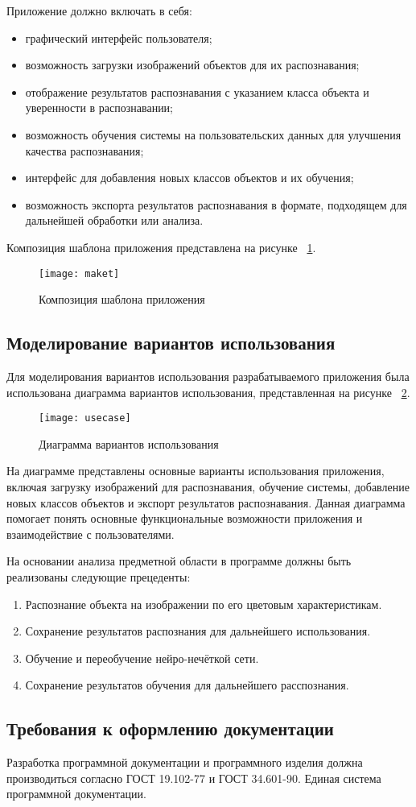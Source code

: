 Приложение должно включать в себя:
\begin{itemize}
    \item графический интерфейс пользователя;
    \item возможность загрузки изображений объектов для их распознавания;
    \item отображение результатов распознавания с указанием класса объекта и уверенности в распознавании;
    \item возможность обучения системы на пользовательских данных для улучшения качества распознавания;
    \item интерфейс для добавления новых классов объектов и их обучения;
    \item возможность экспорта результатов распознавания в формате, подходящем для дальнейшей обработки или анализа.
\end{itemize}

Композиция шаблона приложения представлена на рисунке ~\ref{maket:image}.

\begin{figure}[ht]
\texttt{[image: maket]}
\caption{Композиция шаблона приложения}
\label{maket:image}
\end{figure}

\subsection{Моделирование вариантов использования}

Для моделирования вариантов использования разрабатываемого приложения была использована диаграмма вариантов использования, представленная на рисунке ~\ref{usecase:image}.

\begin{figure}[ht]
\centering
\texttt{[image: usecase]}
\caption{Диаграмма вариантов использования}
\label{usecase:image}
\end{figure}

На диаграмме представлены основные варианты использования приложения, включая загрузку изображений для распознавания, обучение системы, добавление новых классов объектов и экспорт результатов распознавания. Данная диаграмма помогает понять основные функциональные возможности приложения и взаимодействие с пользователями.

На основании анализа предметной области в программе должны быть реализованы следующие прецеденты:
\begin{enumerate}
\item Распознание объекта на изображении по его цветовым характеристикам.
\item Сохранение результатов распознания для дальнейшего использования.
\item Обучение и переобучение нейро-нечёткой сети.
\item Сохранение результатов обучения для дальнейшего расспознания.
\end{enumerate}

\subsection{Требования к оформлению документации}

Разработка программной документации и программного изделия должна производиться согласно ГОСТ 19.102-77 и ГОСТ 34.601-90. Единая система программной документации.
